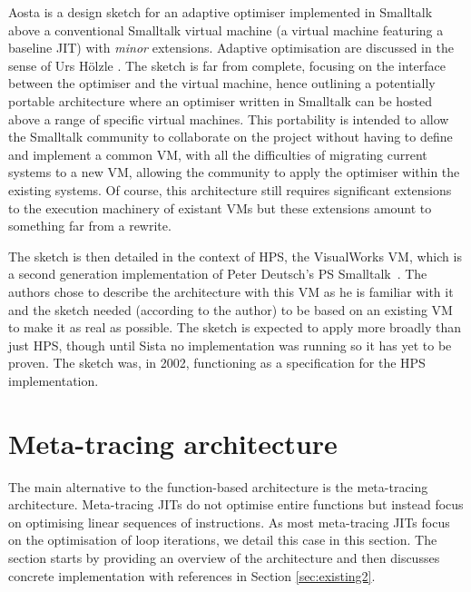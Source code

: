 \documentclass[a4paper,12pt,twoside]{../includes/ThesisStyle}
\begin{document}
Aosta is a design sketch for an adaptive optimiser implemented in Smalltalk above a conventional Smalltalk virtual machine (a virtual machine featuring a baseline JIT) with \emph{minor} extensions. Adaptive optimisation are discussed in the sense of Urs H\"olzle \cite{UrsPHD}. The sketch is far from complete, focusing on the interface between the optimiser and the virtual machine, hence outlining a potentially portable architecture where an optimiser written in Smalltalk can be hosted above a range of specific virtual machines. This portability is intended to allow the Smalltalk community to collaborate on the project without having to define and implement a common VM, with all the difficulties of migrating current systems to a new VM, allowing the community to apply the optimiser within the existing systems.  Of course, this architecture still requires significant extensions to the execution machinery of existant VMs but these extensions amount to something far from a rewrite.

The sketch is then detailed in the context of HPS, the VisualWorks VM, which is a second generation implementation of Peter Deutsch's PS Smalltalk~\cite{Deut84a}. The authors chose to describe the architecture with this VM as he is familiar with it and the sketch needed (according to the author) to be based on an existing VM to make it as real as possible. The sketch is expected to apply more broadly than just HPS, though until Sista no implementation was running so it has yet to be proven. The sketch was, in 2002, functioning as a specification for the HPS implementation. 


\section{Meta-tracing architecture}
\label{sec:metaArchitecture}

The main alternative to the function-based architecture is the meta-tracing architecture. Meta-tracing JITs do not optimise entire functions but instead focus on optimising linear sequences of instructions. As most meta-tracing JITs focus on the optimisation of loop iterations, we detail this case in this section. The section starts by providing an overview of the architecture and then discusses concrete implementation with references in Section \ref{sec:existing2}.
\end{document}
